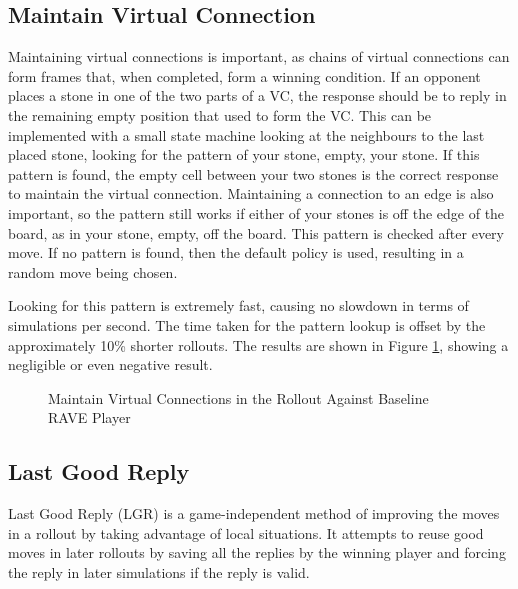 \subsection{Maintain Virtual Connection}

Maintaining virtual connections is important, as chains of virtual connections can form frames that, when completed, form a winning condition. If an opponent places a stone in one of the two parts of a VC, the response should be to reply in the remaining empty position that used to form the VC. This can be implemented with a small state machine looking at the neighbours to the last placed stone, looking for the pattern of your stone, empty, your stone. If this pattern is found, the empty cell between your two stones is the correct response to maintain the virtual connection. Maintaining a connection to an edge is also important, so the pattern still works if either of your stones is off the edge of the board, as in your stone, empty, off the board. This pattern is checked after every move. If no pattern is found, then the default policy is used, resulting in a random move being chosen.

Looking for this pattern is extremely fast, causing no slowdown in terms of simulations per second. The time taken for the pattern lookup is offset by the approximately 10\% shorter rollouts. The results are shown in Figure \ref{fig:maintainvcrollout}, showing a negligible or even negative result.

\begin{figure}
	\centering
{}
	\caption{Maintain Virtual Connections in the Rollout Against Baseline RAVE Player}
	\label{fig:maintainvcrollout}
\end{figure}

\subsection{Last Good Reply}

Last Good Reply (LGR) is a game-independent method of improving the moves in a rollout by taking advantage of local situations. It attempts to reuse good moves in later rollouts by saving all the replies by the winning player and forcing the reply in later simulations if the reply is valid.

